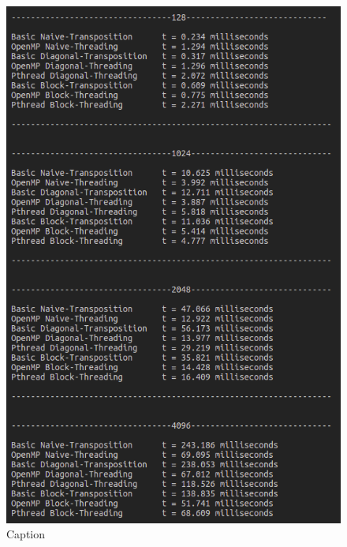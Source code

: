 \documentclass[conference]{IEEEtran}
\begin{document}
\begin{figure}[h!]
    \centering
    \includegraphics[scale = 0.6]{2a.png}
    \caption{Caption}
    \label{fig:my_label}
\end{figure}
\end{document}
